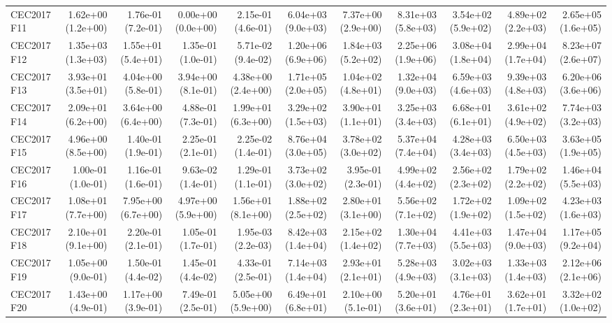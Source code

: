 \begin{longtable}{lrrrrrrrrrr}
CEC2017 F11 & 1.62e+00 (1.2e+00) & 1.76e-01 (7.2e-01) & 0.00e+00 (0.0e+00) & 2.15e-01 (4.6e-01) & 6.04e+03 (9.0e+03) & 7.37e+00 (2.9e+00) & 8.31e+03 (5.8e+03) & 3.54e+02 (5.9e+02) & 4.89e+02 (2.2e+03) & 2.65e+05 (1.6e+05) \\
CEC2017 F12 & 1.35e+03 (1.3e+03) & 1.55e+01 (5.4e+01) & 1.35e-01 (1.0e-01) & 5.71e-02 (9.4e-02) & 1.20e+06 (6.9e+06) & 1.84e+03 (5.2e+02) & 2.25e+06 (1.9e+06) & 3.08e+04 (1.8e+04) & 2.99e+04 (1.7e+04) & 8.23e+07 (2.6e+07) \\
CEC2017 F13 & 3.93e+01 (3.5e+01) & 4.04e+00 (5.8e-01) & 3.94e+00 (8.1e-01) & 4.38e+00 (2.4e+00) & 1.71e+05 (2.0e+05) & 1.04e+02 (4.8e+01) & 1.32e+04 (9.0e+03) & 6.59e+03 (4.6e+03) & 9.39e+03 (4.8e+03) & 6.20e+06 (3.6e+06) \\
CEC2017 F14 & 2.09e+01 (6.2e+00) & 3.64e+00 (6.4e+00) & 4.88e-01 (7.3e-01) & 1.99e+01 (6.3e+00) & 3.29e+02 (1.5e+03) & 3.90e+01 (1.1e+01) & 3.25e+03 (3.4e+03) & 6.68e+01 (6.1e+01) & 3.61e+02 (4.9e+02) & 7.74e+03 (3.2e+03) \\
CEC2017 F15 & 4.96e+00 (8.5e+00) & 1.40e-01 (1.9e-01) & 2.25e-01 (2.1e-01) & 2.25e-02 (1.4e-01) & 8.76e+04 (3.0e+05) & 3.78e+02 (3.0e+02) & 5.37e+04 (7.4e+04) & 4.28e+03 (3.4e+03) & 6.50e+03 (4.5e+03) & 3.63e+05 (1.9e+05) \\
CEC2017 F16 & 1.00e-01 (1.0e-01) & 1.16e-01 (1.6e-01) & 9.63e-02 (1.4e-01) & 1.29e-01 (1.1e-01) & 3.73e+02 (3.0e+02) & 3.95e-01 (2.3e-01) & 4.99e+02 (4.4e+02) & 2.56e+02 (2.3e+02) & 1.79e+02 (2.2e+02) & 1.46e+04 (5.5e+03) \\
CEC2017 F17 & 1.08e+01 (7.7e+00) & 7.95e+00 (6.7e+00) & 4.97e+00 (5.9e+00) & 1.56e+01 (8.1e+00) & 1.88e+02 (2.5e+02) & 2.80e+01 (3.1e+00) & 5.56e+02 (7.1e+02) & 1.72e+02 (1.9e+02) & 1.09e+02 (1.5e+02) & 4.23e+03 (1.6e+03) \\
CEC2017 F18 & 2.10e+01 (9.1e+00) & 2.20e-01 (2.1e-01) & 1.05e-01 (1.7e-01) & 1.95e-03 (2.2e-03) & 8.42e+03 (1.4e+04) & 2.15e+02 (1.4e+02) & 1.30e+04 (7.7e+03) & 4.41e+03 (5.5e+03) & 1.47e+04 (9.0e+03) & 1.17e+05 (9.2e+04) \\
CEC2017 F19 & 1.05e+00 (9.0e-01) & 1.50e-01 (4.4e-02) & 1.45e-01 (4.4e-02) & 4.33e-01 (2.5e-01) & 7.14e+03 (1.4e+04) & 2.93e+01 (2.1e+01) & 5.28e+03 (4.9e+03) & 3.02e+03 (3.1e+03) & 1.33e+03 (1.4e+03) & 2.12e+06 (2.1e+06) \\
CEC2017 F20 & 1.43e+00 (4.9e-01) & 1.17e+00 (3.9e-01) & 7.49e-01 (2.5e-01) & 5.05e+00 (5.9e+00) & 6.49e+01 (6.8e+01) & 2.10e+00 (5.1e-01) & 5.20e+01 (3.6e+01) & 4.76e+01 (2.3e+01) & 3.62e+01 (1.7e+01) & 3.32e+02 (1.0e+02) \\

\end{longtable}

